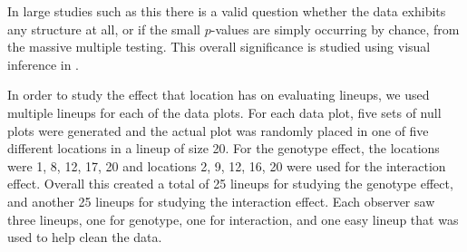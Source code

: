 \documentclass[10pt]{article}\usepackage[]{graphicx}\usepackage[]{color}
\newcommand{\mm}[1]{{\color{mahbub} #1}}
\begin{document}
In large studies such as this there is a valid question whether the data exhibits any structure at all, or if the small $p$-values are simply occurring by chance, from the massive multiple testing. This overall significance is studied using visual inference  in \citet{tengfei:2013}. 


In order to study the effect that  location has on evaluating lineups, we used multiple lineups for each of the data plots. For each data plot, five sets of null plots were generated and the actual plot was randomly placed in one of five different locations in a lineup of size 20. 
For the genotype effect, the locations were  1, 8, 12, 17, 20 and locations 2, 9, 12, 16, 20 were used for the interaction effect. %
Overall this created a total of 25 lineups for studying the genotype effect, and another 25 lineups for studying the interaction effect. Each observer saw three lineups, one for genotype, one for interaction, and one easy lineup that was used to help clean the data. 
\end{document}
